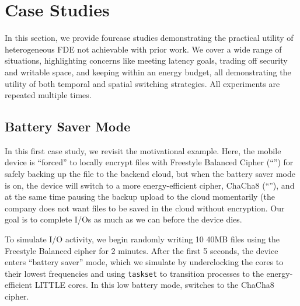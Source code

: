 \section{Case Studies}\label{sec:usecases}

In this section, we provide four\xxx case studies demonstrating the practical
utility of heterogeneous FDE not achievable with prior work. We cover a wide
range of situations, highlighting concerns like meeting latency goals, trading
off security and writable space, and keeping within an energy budget, all
demonstrating the utility of both temporal and spatial switching strategies. All
experiments are repeated multiple times.


\subsection{Battery Saver Mode}\label{subsec:uc1}

In this first case study, we revisit the motivational example.  Here, the mobile
device is ``forced'' to locally encrypt files with Freestyle Balanced Cipher
(``\cone'') for safely backing up the file to the backend cloud, but when the
battery saver mode is on, the device will switch to a more energy-efficient
cipher, ChaCha8 (``\ctwo''), and at the same time pausing the backup upload to
the cloud momentarily (\eg the company does not want files to be saved in the
cloud without \cone encryption. Our goal is to complete I/Os as much as we can
before the device dies.

To simulate I/O activity, we begin randomly writing 10 40MB files using the
Freestyle Balanced cipher for 2 minutes.  After the first 5 seconds, the device
enters ``battery saver'' mode, which we simulate by underclocking the cores to
their lowest frequencies and using \texttt{taskset} to transition \sys processes
to the energy-efficient LITTLE cores.  In this low battery mode, \sys switches
to the ChaCha8 cipher.



